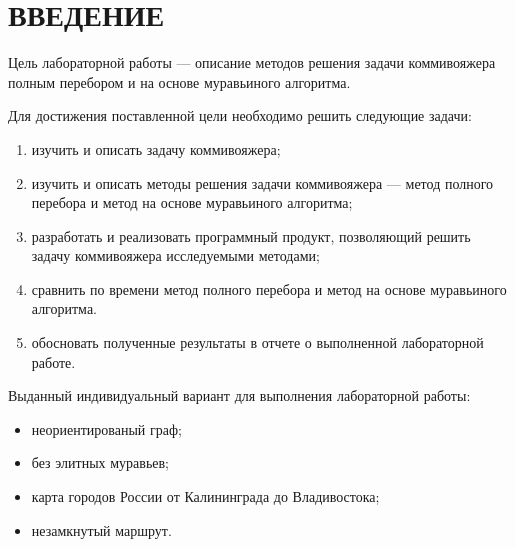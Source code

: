 \chapter*{ВВЕДЕНИЕ}


Цель лабораторной работы --- описание методов решения задачи коммивояжера полным перебором и на основе муравьиного алгоритма.

Для достижения поставленной цели необходимо решить следующие задачи:

\begin{enumerate}[label={\arabic*)}]
	\item изучить и описать задачу коммивояжера;
	\item изучить и описать методы решения задачи коммивояжера ---  метод полного перебора и метод на основе муравьиного алгоритма;
	\item разработать и реализовать программный продукт, позволяющий решить задачу коммивояжера исследуемыми методами;
	\item сравнить по времени метод полного перебора и метод на основе муравьиного алгоритма.
	\item обосновать полученные результаты в отчете о выполненной лабораторной работе.
\end{enumerate}

Выданный индивидуальный вариант для выполнения лабораторной работы:

\begin{itemize}[label*=--]
	\item неориентированый граф;
	\item без элитных муравьев;
	\item карта городов России от Калининграда до Владивостока;
	\item незамкнутый маршрут.
\end{itemize}